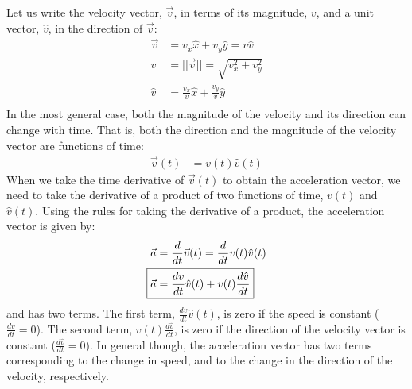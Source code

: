Let us write the velocity vector, $\vec v$, in terms of its magnitude, $v$, and a unit vector, $\hat v$, in the direction of $\vec v$:
\begin{align*}
\vec v &=v_x\hat x+v_y\hat y= v \hat v\\
v&=||\vec v||=\sqrt{v_x^2+v_y^2}\\
\hat v &= \frac{v_x}{v}\hat x+\frac{v_y}{v}\hat y\\
\end{align*}
In the most general case, both the magnitude of the velocity and its direction can change with time. That is, both the direction and the magnitude of the velocity vector are functions of time:
\begin{align*}
\vec v(t)&=v(t)\hat v(t)
\end{align*}
When we take the time derivative of $\vec v(t)$ to obtain the acceleration vector, we need to take the derivative of a product of two functions of time, $v(t)$ and $\hat v(t)$. Using the rules for taking the derivative of a product, the acceleration vector is given by:
\begin{align}
\label{eqn:DescribingMotionInND:avecdef2}
\vec a &= \frac{d}{dt}\vec v(t)= \frac{d}{dt}v(t)\hat v(t)\nonumber\\
\Aboxed{\vec a&=\frac{dv}{dt}\hat v(t)+v(t)\frac{d\hat v}{dt}}
\end{align}
and has two terms. The first term, $\frac{dv}{dt}\hat v(t)$, is zero if the speed is constant ($\frac{dv}{dt}=0$). The second term, $v(t)\frac{d\hat v}{dt}$, is zero if the direction of the velocity vector is constant ($\frac{d\hat v}{dt}=0$). In general though, the acceleration vector has two terms corresponding to the change in speed, and to the change in the direction of the velocity, respectively.

